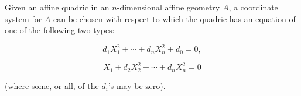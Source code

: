 Given an affine quadric in an $n$-dimensional affine geometry $A$, a coordinate system for $A$ can be chosen with respect to which the quadric has an equation of one of the following two types:

$$d_1 X_1^2 + \cdots + d_n X_n^2 + d_0 = 0,$$

$$X_1 + d_2 X_2^2 + \cdots + d_n X_n^2 = 0$$

(where some, or all, of the $d_i$'s may be zero).
